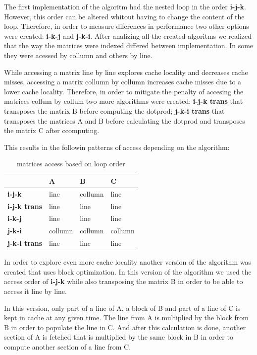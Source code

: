 \documentclass[a4paper]{report}
\begin{document}
The first implementation of the algoritm had the nested loop in the order
\textbf{i-j-k}. However, this order can be altered whitout having to change the
content of the loop. Therefore, in order to measure diferences in performance
two other options were created: \textbf{i-k-j} and \textbf{j-k-i}. After
analizing all the created algoritms we realized that the way the matrices were
indexed differed between implementation. In some they were acessed by collumn
and others by line.

While accessing a matrix line by line explores cache locality and decreases
cache misses, accessing a matrix collumn by collumn increases cache misses due
to a lower cache locality. Therefore, in order to mitigate the penalty of
accesing the matrices collum by collum two more algorithms were created:
\textbf{i-j-k trans} that transposes the matrix B before computing the
dotprod; \textbf{j-k-i trans} that transposes the matrices A and B before
calculating the dotprod and transposes the matrix C after ccomputing.

This results in the followin patterns of access depending on the algorithm:

\begin{table}[H]
\centering
\begin{tabular}{|l|l|l|l|}
\hline
                     & A       & B       & C       \\ \hline
\textbf{i-j-k}       & line    & collumn & line    \\ \hline
\textbf{i-j-k trans} & line    & line    & line    \\ \hline
\textbf{i-k-j}       & line    & line    & line    \\ \hline
\textbf{j-k-i}       & collumn & collumn & collumn \\ \hline
\textbf{j-k-i trans} & line    & line    & line    \\ \hline
\end{tabular}
\caption{matrices access based on loop order}
\end{table}

In order to explore even more cache locality another version of the algorithm
was created that uses block optimization. In this version of the algorithm we
used the access order of \textbf{i-j-k} while also transposing the matrix B in
order to be able to access it line by line.

In this version, only part of a line of A, a block of B and part of a line of C
is kept in cache at any given time. The line from A is multiplied by the block
from B in order to populate the line in C. And after this calculation is done,
another section of A is fetched that is multiplied by the same block in B
in order to compute another section of a line from C.
\end{document}
